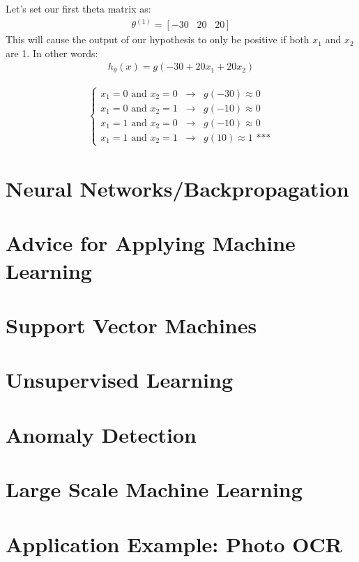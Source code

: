 \documentclass{article}
\begin{document}
            Let's set our first theta matrix as:
            \begin{align*}
                \theta^{(1)} = [-30 \; \; \; 20 \; \; \; 20]
            \end{align*}
            This will cause the output of our hypothesis to only be positive if both $x_1$ and $x_2$ are 1. In other words:
            \begin{align*}
                h_{\theta}(x) = g(-30 + 20x_1 + 20x_2)
            \end{align*}
            
            \begin{align*}
                \begin{cases}
                    x_1 = 0 \text{  and  } x_2 = 0 \; \; \longrightarrow \; \; g(-30) \approx 0 \\
                    x_1 = 0 \text{  and  } x_2 = 1 \; \; \longrightarrow \; \; g(-10) \approx 0 \\
                    x_1 = 1 \text{  and  } x_2 = 0 \; \; \longrightarrow \; \; g(-10) \approx 0 \\
                    x_1 = 1 \text{  and  } x_2 = 1 \; \; \longrightarrow \; \; g(10) \approx 1 \text{  ***}
                \end{cases}
            \end{align*}
    \newpage
    \section{Neural Networks/Backpropagation}



    \section{Advice for Applying Machine Learning}



    \section{Support Vector Machines}



    \section{Unsupervised Learning}



    \section{Anomaly Detection}



    \section{Large Scale Machine Learning}



    \section{Application Example: Photo OCR}
\end{document}
